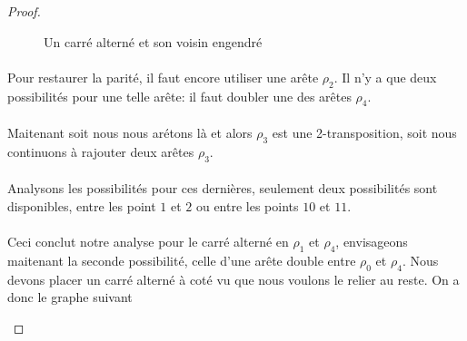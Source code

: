 \begin{proof}
\begin{figure}[H]
\begin{center}
\begin{tikzpicture}
      \end{tikzpicture}
      \caption{Un carré alterné et son voisin engendré}
    \end{center}
  \end{figure}

  \paragraph{}
  Pour restaurer la parité, il faut encore utiliser une arête $\rho_2$. Il n'y a que deux possibilités pour une telle arête: il faut doubler une des arêtes $\rho_4$.

  \paragraph{}
  Maitenant soit nous nous arétons là et alors $\rho_3$ est une 2-transposition, soit nous continuons à rajouter deux arêtes $\rho_3$.

  \paragraph{}
  Analysons les possibilités pour ces dernières, seulement deux possibilités sont disponibles, entre les point $1$ et $2$ ou entre les points $10$ et $11$.

  \paragraph{}
  Ceci conclut notre analyse pour le carré alterné en $\rho_1$ et $\rho_4$, envisageons maitenant la seconde possibilité, celle d'une arête double entre $\rho_0$ et $\rho_4$. Nous devons placer un carré alterné à coté vu que nous voulons le relier au reste. On a donc le graphe suivant

  \begin{figure}[H]
    \begin{center}
\end{center}
\end{figure}
\end{proof}

